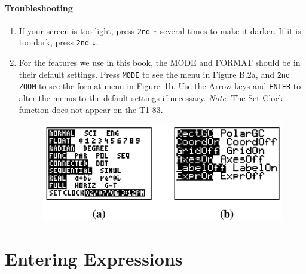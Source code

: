 \documentclass[10pt,]{book}
\theoremstyle{plain}
\theoremstyle{definition}
\theoremstyle{definition}
\theoremstyle{definition}
\numberwithin{equation}{part}
\begin{document}
\paragraph[{Troubleshooting}]{Troubleshooting}\hypertarget{troubleshooting}{}
\leavevmode%
\begin{enumerate}[label=*\arabic**]
\item\hypertarget{li-405}{}If your screen is too light, press \lstinline?2nd? \lstinline?↑? several times to make it darker. If it is too dark, press \lstinline?2nd? \lstinline?↓?.%
\item\hypertarget{li-406}{}For the features we use in this book, the MODE and FORMAT should be in their default settings. Press \lstinline?MODE? to see the menu in Figure B.2a, and \lstinline?2nd? \lstinline?ZOOM? to see the format menu in \hyperref[fig-GC-settings]{Figure~\ref{fig-GC-settings}}b. Use the Arrow keys and \lstinline?ENTER? to alter the menus to the default settings if necessary. \emph{Note}: The Set Clock function does not appear on the T1-83. \leavevmode%
\begin{figure}
\centering
\includegraphics[width=0.75\linewidth]{images/fig-GC-settings.jpg}
\caption{\label{fig-GC-settings}}
\end{figure}
%
\end{enumerate}
%
\typeout{************************************************}
\typeout{************************************************}
\section[{Entering Expressions}]{Entering Expressions}\label{appendix-Entering-Expressions}
\typeout{************************************************}
\typeout{************************************************}
\end{document}
